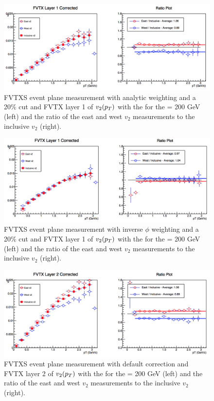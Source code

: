 \begin{figure}[!ht]
\centering
\includegraphics[width=0.65\linewidth]{figs/fvtx_1_analytic.png}
\caption{FVTXS event plane measurement with analytic weighting and a 20\% cut and FVTX layer 1 of $v_{2}(\mbox{$p_T$})$ with the  for the \pau \sqsn = 200 GeV (left) and the ratio of the east and west $v_2$ measurements to the inclusive $v_2$ (right).}
\end{figure}

\begin{figure}[!ht]
\centering
\includegraphics[width=0.65\linewidth]{figs/fvtx_1_data_cut.png}
\caption{FVTXS event plane measurement with inverse $\phi$ weighting and a 20\% cut and FVTX layer 1 of $v_{2}(\mbox{$p_T$})$ with the  for the \pau \sqsn = 200 GeV (left) and the ratio of the east and west $v_2$ measurements to the inclusive $v_2$ (right).}
\end{figure}

\begin{figure}[!ht]
\centering
\includegraphics[width=0.65\linewidth]{figs/fvtx_2_default.png}
\caption{FVTXS event plane measurement with default correction and FVTX layer 2 of $v_{2}(\mbox{$p_T$})$ with the  for the \pau \sqsn = 200 GeV (left) and the ratio of the east and west $v_2$ measurements to the inclusive $v_2$ (right).}
\end{figure}

